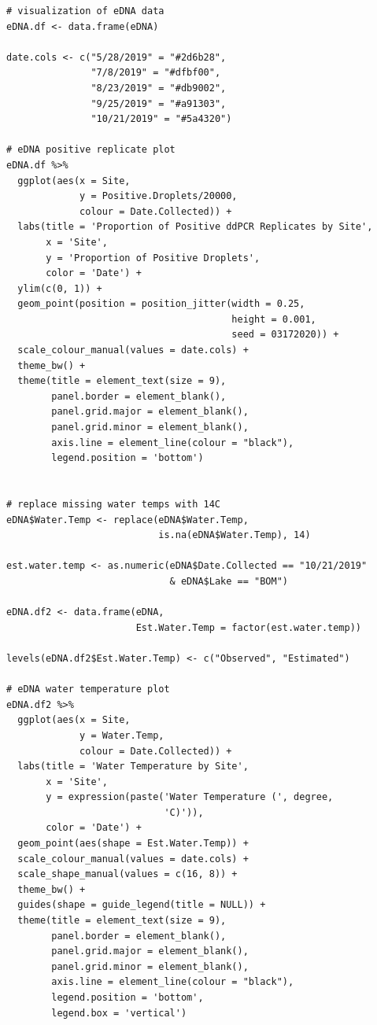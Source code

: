 \documentclass[12pt]{article}\usepackage[]{graphicx}\usepackage[]{color}
\makeatletter
\newenvironment{kframe}{%
 \def\at@end@of@kframe{}%
 \ifinner\ifhmode%
  \def\at@end@of@kframe{\end{minipage}}%
  \begin{minipage}{\columnwidth}%
 \fi\fi%
 \def\FrameCommand##1{\hskip\@totalleftmargin \hskip-\fboxsep
 \colorbox{shadecolor}{##1}\hskip-\fboxsep
     \hskip-\linewidth \hskip-\@totalleftmargin \hskip\columnwidth}%
 \MakeFramed {\advance\hsize-\width
   \@totalleftmargin\z@ \linewidth\hsize
   \@setminipage}}%
 {\par\unskip\endMakeFramed%
 \at@end@of@kframe}
\newenvironment{knitrout}{}{} %
\newenvironment{kframe}{%
 \def\at@end@of@kframe{}%
 \ifinner\ifhmode%
  \def\at@end@of@kframe{\end{minipage}}%
  \begin{minipage}{\columnwidth}%
 \fi\fi%
 \def\FrameCommand##1{\hskip\@totalleftmargin \hskip-\fboxsep
 \colorbox{shadecolor}{##1}\hskip-\fboxsep
     \hskip-\linewidth \hskip-\@totalleftmargin \hskip\columnwidth}%
 \MakeFramed {\advance\hsize-\width
   \@totalleftmargin\z@ \linewidth\hsize
   \@setminipage}}%
 {\par\unskip\endMakeFramed%
 \at@end@of@kframe}
\newenvironment{knitrout}{}{} %
\makeatother
\begin{document}
\begin{knitrout}
\begin{kframe}
\begin{verbatim}
# visualization of eDNA data
eDNA.df <- data.frame(eDNA)

date.cols <- c("5/28/2019" = "#2d6b28", 
               "7/8/2019" = "#dfbf00",
               "8/23/2019" = "#db9002",
               "9/25/2019" = "#a91303",
               "10/21/2019" = "#5a4320")

# eDNA positive replicate plot
eDNA.df %>% 
  ggplot(aes(x = Site, 
             y = Positive.Droplets/20000, 
             colour = Date.Collected)) + 
  labs(title = 'Proportion of Positive ddPCR Replicates by Site', 
       x = 'Site', 
       y = 'Proportion of Positive Droplets', 
       color = 'Date') +
  ylim(c(0, 1)) + 
  geom_point(position = position_jitter(width = 0.25, 
                                        height = 0.001, 
                                        seed = 03172020)) + 
  scale_colour_manual(values = date.cols) + 
  theme_bw() + 
  theme(title = element_text(size = 9),
        panel.border = element_blank(), 
        panel.grid.major = element_blank(),
        panel.grid.minor = element_blank(), 
        axis.line = element_line(colour = "black"), 
        legend.position = 'bottom')


# replace missing water temps with 14C
eDNA$Water.Temp <- replace(eDNA$Water.Temp, 
                           is.na(eDNA$Water.Temp), 14)

est.water.temp <- as.numeric(eDNA$Date.Collected == "10/21/2019" 
                             & eDNA$Lake == "BOM")

eDNA.df2 <- data.frame(eDNA, 
                       Est.Water.Temp = factor(est.water.temp))

levels(eDNA.df2$Est.Water.Temp) <- c("Observed", "Estimated")

# eDNA water temperature plot
eDNA.df2 %>% 
  ggplot(aes(x = Site, 
             y = Water.Temp, 
             colour = Date.Collected)) + 
  labs(title = 'Water Temperature by Site', 
       x = 'Site', 
       y = expression(paste('Water Temperature (', degree,
                            'C)')), 
       color = 'Date') +
  geom_point(aes(shape = Est.Water.Temp)) + 
  scale_colour_manual(values = date.cols) + 
  scale_shape_manual(values = c(16, 8)) + 
  theme_bw() +
  guides(shape = guide_legend(title = NULL)) + 
  theme(title = element_text(size = 9),
        panel.border = element_blank(), 
        panel.grid.major = element_blank(),
        panel.grid.minor = element_blank(), 
        axis.line = element_line(colour = "black"), 
        legend.position = 'bottom', 
        legend.box = 'vertical')



\end{verbatim}
\end{kframe}
\end{knitrout}
\end{document}
